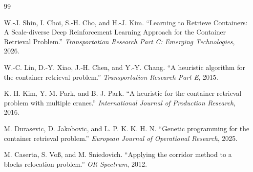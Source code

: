 \documentclass[11pt,a4paper]{article}
\theoremstyle{definition}
\newcommand{\1}{\mathbbm{1}}
\begin{document}

\begin{thebibliography}{99}

W.-J. Shin, I. Choi, S.-H. Cho, and H.-J. Kim.
``Learning to Retrieve Containers: A Scale-diverse Deep Reinforcement Learning Approach for the Container Retrieval Problem.''
\textit{Transportation Research Part C: Emerging Technologies}, 2026.

W.-C. Lin, D.-Y. Xiao, J.-H. Chen, and Y.-Y. Chang.
``A heuristic algorithm for the container retrieval problem.''
\textit{Transportation Research Part E}, 2015.

K.-H. Kim, Y.-M. Park, and B.-J. Park.
``A heuristic for the container retrieval problem with multiple cranes.''
\textit{International Journal of Production Research}, 2016.

M. Durasevic, D. Jakobovic, and L. P. K. K. H. N.
``Genetic programming for the container retrieval problem.''
\textit{European Journal of Operational Research}, 2025.

M. Caserta, S. Vo\ss, and M. Sniedovich.
``Applying the corridor method to a blocks relocation problem.''
\textit{OR Spectrum}, 2012.

\end{thebibliography}
\end{document}
